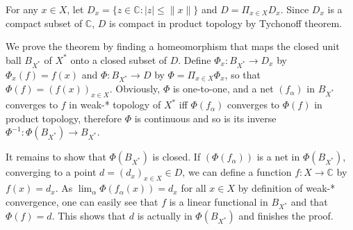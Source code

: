 \documentclass{article}
\begin{document}
For any $x\in X$, let $D_x=\{z\in\mathbb{C}: |z|\leq \|x\|\}$ and $D=\Pi_{x\in X} D_x$. Since $D_x$ is a compact subset of $\mathbb{C}$, $D$ is compact in product topology by Tychonoff theorem.

We prove the theorem by finding a homeomorphism that maps the closed unit ball 
$B_{X^*}$ of $X^*$ onto a closed subset of $D$. Define $\Phi_x:B_{X^*}\to D_x$ by 
$\Phi_x(f)=f(x)$ and $\Phi:B_{X^*}\to D$ by $\Phi=\Pi_{x\in X}\Phi_x$, so that
$\Phi(f)=(f(x))_{x\in X}$. Obviously, $\Phi$ is one-to-one, and a net $(f_\alpha)$ in $B_{X^*}$ converges to $f$ in weak-* topology of $X^*$ iff $\Phi(f_\alpha)$ converges to $\Phi(f)$ in product topology, therefore $\Phi$ is continuous and so is its inverse $\Phi^{-1}:\Phi(B_{X^*})\to B_{X^*}$.

It remains to show that $\Phi(B_{X^*})$ is closed. If $(\Phi(f_\alpha))$ is a net
in $\Phi(B_{X^*})$, converging to a point $d=(d_x)_{x\in X}\in D$, we can define a function
$f:X\to \mathbb{C}$ by $f(x)=d_x$. As $\lim_\alpha \Phi(f_\alpha(x))=d_x$ for all $x\in X$ by definition of weak-* convergence, one can easily see that $f$ is a linear functional in $B_{X^*}$ and that $\Phi(f)=d$. This shows that $d$ is actually in $\Phi(B_{X^*})$ and finishes the proof.
\end{document}
